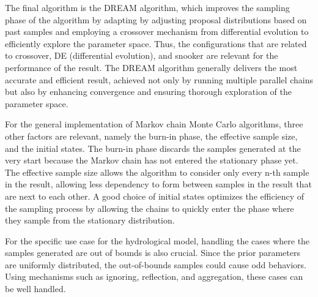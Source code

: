 The final algorithm is the DREAM algorithm, which improves the sampling phase of the algorithm by adapting by adjusting proposal distributions based on past samples and employing a crossover mechanism from differential evolution to efficiently explore the parameter space. Thus, the configurations that are related to crossover, DE (differential evolution), and snooker are relevant for the performance of the result. The DREAM algorithm generally delivers the most accurate and efficient result, achieved not only by running multiple parallel chains but also by enhancing convergence and ensuring thorough exploration of the parameter space.

For the general implementation of Markov chain Monte Carlo algorithms, three other factors are relevant, namely the burn-in phase, the effective sample size, and the initial states. The burn-in phase discards the samples generated at the very start because the Markov chain has not entered the stationary phase yet. The effective sample size allows the algorithm to consider only every n-th sample in the result, allowing less dependency to form between samples in the result that are next to each other. A good choice of initial states optimizes the efficiency of the sampling process by allowing the chains to quickly enter the phase where they sample from the stationary distribution.

For the specific use case for the hydrological model, handling the cases where the samples generated are out of bounds is also crucial. Since the prior parameters are uniformly distributed, the out-of-bounds samples could cause odd behaviors. Using mechanisms such as ignoring, reflection, and aggregation, these cases can be well handled.
